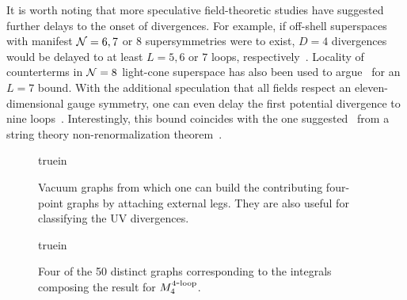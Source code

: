 \documentclass[aps,prl,twocolumn,groupedaddress,draft,showpacs,nofootinbib]{revtex4}
\def\fourloop{{\rm 4\hbox{-}loop}}
\begin{document}
It is worth noting that more speculative field-theoretic
studies have suggested
further delays to the onset of divergences.  For example, if off-shell
superspaces with manifest ${\cal N} = 6,7$ or $8$ supersymmetries were
to exist, $D=4$ divergences would be delayed to at least
$L=5,6$ or $7$ loops, respectively~\cite{GrisaruSiegel,HoweStelleNew}.
Locality of counterterms in ${\cal N}=8$
light-cone superspace has also been used to
argue~\cite{KalloshLightCone} for an $L=7$ bound.
With the additional speculation that all fields
respect an eleven-dimensional gauge symmetry, one can even delay the first
potential divergence to nine loops~\cite{HoweStelleRecent}. Interestingly,
this bound coincides with the one suggested~\cite{GreenII} from a
string theory non-renormalization theorem~\cite{Berkovits}.  


\begin{figure}[t]
\centerline{ truein }
\caption[a]{\small Vacuum graphs from which one can build the
contributing four-point graphs by attaching external legs.  They are
also useful for classifying the UV divergences.}
\label{VacuumTopologyFigure}
\end{figure}

\begin{figure}[t]
\centerline{ truein }
\caption[a]{\small Four of the 50 distinct graphs corresponding to the
integrals composing the result for $M_4^\fourloop$.  }
\label{ExampleL8Figure}
\end{figure}
\end{document}
